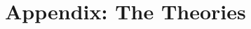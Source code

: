 \documentclass[11pt,a4paper]{book}
\begin{document}
\cite{nipkow.ea:isabelle:2002}


\chapter{Appendix: The Theories}





\end{document}
